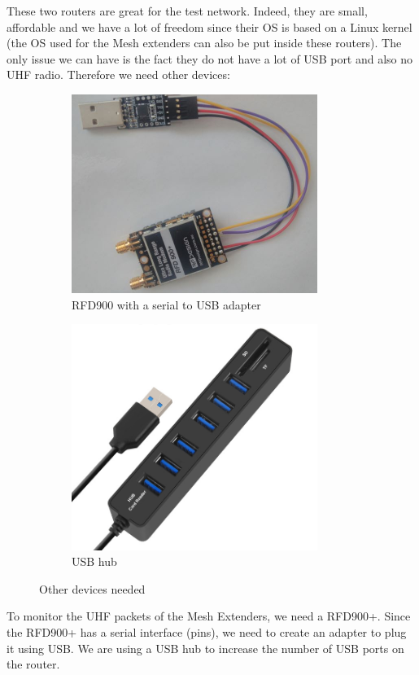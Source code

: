 These two routers are great for the test network. Indeed, they are small, affordable and we have a lot of freedom since their OS is based on a Linux kernel (the OS used for the Mesh extenders can also be put inside these routers).
The only issue we can have is the fact they do not have a lot of USB port and also no UHF radio. Therefore we need other devices:
\begin{figure}[H]
\centering
\begin{subfigure}{.5\textwidth}
  \centering
	\includegraphics[width=8cm]{image/rfd900.jpg}%
	\caption{RFD900 with a serial to USB adapter}%
	\label{figure:RFD900}%
\end{subfigure}%
\begin{subfigure}{.5\textwidth}
  \centering
  \includegraphics[width=8cm]{image/usbhub.jpg}%
	\caption{USB hub}%
	\label{figure:UsbHub}%
\end{subfigure}
\caption{Other devices needed}
\label{fig:devices}
\end{figure}

To monitor the UHF packets of the Mesh Extenders, we need a RFD900+. Since the RFD900+ has a serial interface (pins), we need to create an adapter to plug it using USB.
We are using a USB hub to increase the number of USB ports on the router.

